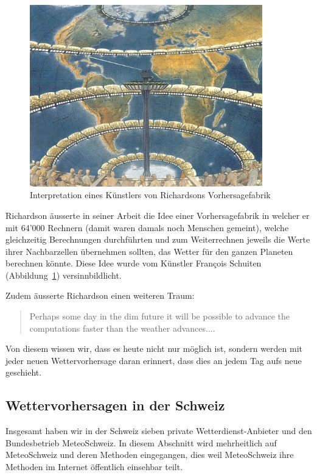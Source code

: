 \begin{refsection}
\begin{figure}
\centering
\includegraphics[width=0.9\textwidth]{klima/64000.jpg}
\caption{Interpretation eines Künstlers von Richardsons Vorhersagefabrik \cite{klima:biography}
\label{klima:geschichte:richardson}}
\end{figure}

Richardson äusserte in seiner Arbeit die Idee einer Vorhersagefabrik in welcher er mit 64'000 Rechnern (damit waren damals noch Menschen gemeint), welche gleichzeitig Berechnungen durchführten und zum Weiterrechnen jeweils die Werte ihrer Nachbarzellen übernehmen sollten, das Wetter für den ganzen Planeten berechnen könnte. Diese Idee wurde vom Künstler François Schuiten (Abbildung~\ref{klima:geschichte:richardson}) versinnbildlicht.

Zudem äusserte Richardson einen weiteren Traum:
\begin{quote}
Perhaps some day in the dim future it will be possible to advance the computations faster than the weather advances....
\end{quote}
Von diesem wissen wir, dass es heute nicht nur möglich ist, sondern werden mit jeder neuen Wettervorhersage daran erinnert, dass dies an jedem Tag aufs neue geschieht.

\subsection{Wettervorhersagen in der Schweiz
\label{klima:section:wettervorhersagen}}

Insgesamt haben wir in der Schweiz sieben private Wetterdienst-Anbieter und den Bundesbetrieb MeteoSchweiz. In diesem Abschnitt wird mehrheitlich auf MeteoSchweiz und deren Methoden eingegangen, dies weil MeteoSchweiz ihre Methoden im Internet öffentlich einsehbar teilt.


\end{refsection}
